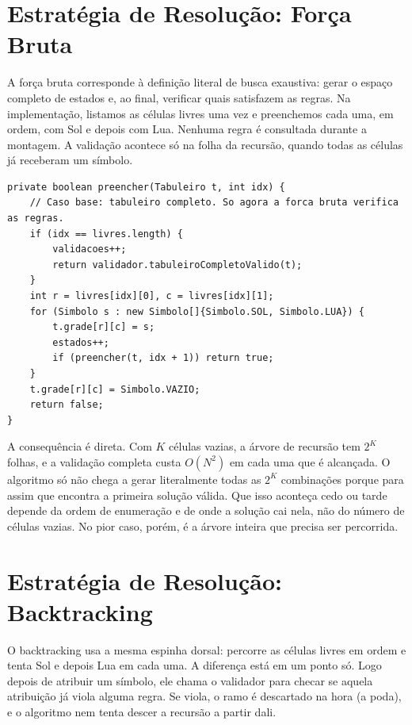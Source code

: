 \documentclass[12pt]{article}
\begin{document}
\section{Estratégia de Resolução: Força Bruta}
\label{sec:forcabruta}

A força bruta corresponde à definição literal de busca exaustiva: gerar o espaço completo de estados e, ao final, verificar quais satisfazem as regras. Na implementação, listamos as células livres uma vez e preenchemos cada uma, em ordem, com Sol e depois com Lua. Nenhuma regra é consultada durante a montagem. A validação acontece só na folha da recursão, quando todas as células já receberam um símbolo.

\begin{lstlisting}
private boolean preencher(Tabuleiro t, int idx) {
    // Caso base: tabuleiro completo. So agora a forca bruta verifica as regras.
    if (idx == livres.length) {
        validacoes++;
        return validador.tabuleiroCompletoValido(t);
    }
    int r = livres[idx][0], c = livres[idx][1];
    for (Simbolo s : new Simbolo[]{Simbolo.SOL, Simbolo.LUA}) {
        t.grade[r][c] = s;
        estados++;
        if (preencher(t, idx + 1)) return true;
    }
    t.grade[r][c] = Simbolo.VAZIO;
    return false;
}
\end{lstlisting}

A consequência é direta. Com $K$ células vazias, a árvore de recursão tem $2^K$ folhas, e a validação completa custa $O(N^2)$ em cada uma que é alcançada. O algoritmo só não chega a gerar literalmente todas as $2^K$ combinações porque para assim que encontra a primeira solução válida. Que isso aconteça cedo ou tarde depende da ordem de enumeração e de onde a solução cai nela, não do número de células vazias. No pior caso, porém, é a árvore inteira que precisa ser percorrida.

\section{Estratégia de Resolução: Backtracking}
\label{sec:backtracking}

O backtracking usa a mesma espinha dorsal: percorre as células livres em ordem e tenta Sol e depois Lua em cada uma. A diferença está em um ponto só. Logo depois de atribuir um símbolo, ele chama o validador para checar se aquela atribuição já viola alguma regra. Se viola, o ramo é descartado na hora (a poda), e o algoritmo nem tenta descer a recursão a partir dali.
\end{document}

